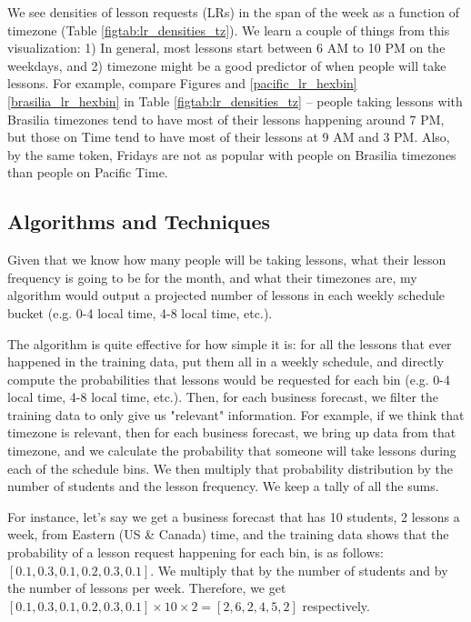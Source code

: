 \documentclass[oneside]{article}
\begin{document}
We see densities of lesson requests (LRs) in the span of the week as a function of
timezone (Table \ref{figtab:lr_densities_tz}). We learn a couple of things from
this visualization: 1) In general, most lessons start between 6 AM to 10 PM on
the weekdays, and 2) timezone might be a good predictor of when people will
take lessons. For example, compare Figures and \ref{pacific_lr_hexbin}
\ref{brasilia_lr_hexbin} in Table \ref{figtab:lr_densities_tz} -- people taking
lessons with Brasilia timezones tend to have most of their lessons happening
around 7 PM, but those on Time tend to have most of their lessons at 9 AM and 3
PM. Also, by the same token, Fridays are not as popular with people on Brasilia
timezones than people on Pacific Time.

\subsection{Algorithms and Techniques}

Given that we know how many people will be taking lessons, what their lesson
frequency is going to be for the month, and what their timezones are, my
algorithm would output a projected number of lessons in each weekly schedule
bucket (e.g. 0-4 local time, 4-8 local time, etc.).

The algorithm is quite effective for how simple it is: for all the lessons that
ever happened in the training data, put them all in a weekly schedule, and
directly compute the probabilities that lessons would be requested for each bin
(e.g. 0-4 local time, 4-8 local time, etc.). Then, for each business forecast,
we filter the training data to only give us "relevant" information. For
example, if we think that timezone is relevant, then for each business
forecast, we bring up data from that timezone, and we calculate the probability
that someone will take lessons during each of the schedule bins.  We then
multiply that probability distribution by the number of students and the lesson
frequency. We keep a tally of all the sums.

For instance, let's say we get a business forecast that has 10 students, 2
lessons a week, from Eastern (US \& Canada) time, and the training data shows
that the probability of a lesson request happening for each bin, is as follows:
$[0.1, 0.3, 0.1, 0.2, 0.3, 0.1]$. We multiply that by the number of students
and by the number of lessons per week.  Therefore, we get $[0.1, 0.3, 0.1, 0.2,
0.3, 0.1] \times 10 \times 2 = [2,6,2,4,5,2]$ respectively.
\end{document}
